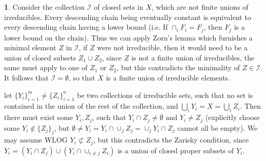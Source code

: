 \documentclass[10.5pt]{article}
\theoremstyle{definition}
\newtheorem{pb}{}
\newcommand{\set}[1]{\{#1\}}
\newcommand{\tand}[1]{\text{ and }}
\newcommand{\tor}[1]{\text{ or }}
\begin{document}
    \begin{pb}
        Consider the collection \(\mathcal{I}\) of closed sets in \(X\), which are not finite unions of irreducibles. Every descending chain being eventually constant is equivalent to every descending chain having a lower bound
        (i.e. If \(\cap_i F_i = F_j\), then \(F_j\) is a lower bound on the chain).
        Thus we can apply Zorn's lemma which furnishes a minimal element \(Z\) in \(\mathcal{I}\), if \(Z\) were not irreducible, then it would need to be a union of closed subsets \(Z_1\cup Z_2\),
        since \(Z\) is not a finite union of irreducibles, the same must apply to one of \(Z_1 \tor ZZ_2\), but this contradicts the minimality of \(Z \in \mathcal{I}\). It follows that
        \(\mathcal{I} = \emptyset\), so that \(X\) is a finite union of irreducible elements.

        let \(\set{Y_i}_{i = 1}^m \neq \set{Z_i}_{i = 1}^n\) be two collections
        of irreducible sets, such that no set is contained in the union of the rest of the collection, and \(\bigcup_i Y_i = X = \bigcup_i Z_i\).
        Then there must exist some \(Y_i, Z_j\), such that \(Y_i \cap Z_j \neq \emptyset \tand YY_i \neq Z_j\)
        (explicitly choose some \(Y_i \not \in \set{Z_j}_j\), but \(\emptyset \neq Y_i = Y_i \cap \cup_j Z_j = \cup_j Y_i \cap Z_j\)
         cannot all be empty). We may assume WLOG \(Y_i \not \subset Z_j\), but this contradicts the Zarisky condition, since 
        \(Y_i = (Y_i \cap Z_j) \cup (Y_i \cap \cup_{i \neq j}Z_i)\) is a union of closed proper subsets of \(Y_i\).
    \end{pb}
\end{document}
